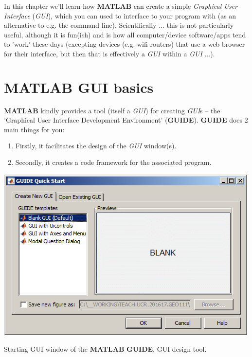 \documentclass{tufte-book} %
\begin{document}

\begin{fullwidth}

In this chapter we'll learn how \textbf{MATLAB} can create a simple \textit{Graphical User Interface} (\textit{GUI}), which you can used to interface to your program with (as an alternative to e.g. the command line). Scientifically ... this is not particularly useful, although it is fun(ish) and is how all computer/device software/apps tend to 'work' these days (excepting devices (e.g. wifi routers) that use a web-browser for their interface, but then that is effectively a \textit{GUI} within a \textit{GUI} ...).

\end{fullwidth}


\newpage


\section{\textbf{MATLAB} GUI basics}

\textbf{MATLAB} kindly provides a tool (itself a \textit{GUI}) for creating \textit{GUI}s -- the 'Graphical User Interface Development Environment' (\textbf{GUIDE}). \textbf{GUIDE} does 2 main things for you:
\begin{enumerate}[noitemsep]
\setlength{\itemindent}{.2in}
\item Firstly, it facilitates the design of the \textit{GUI} window(s).
\item Secondly, it creates a code framework for the associated program.
\end{enumerate}

\begin{marginfigure}[0.0in]
\includegraphics[width=\linewidth]{chGUI-START.png}
\caption{Starting GUI window of the \textbf{MATLAB} \textbf{GUIDE}, GUI design tool.}
\label{fig:chGUI-START}
\end{marginfigure}
\end{document}
